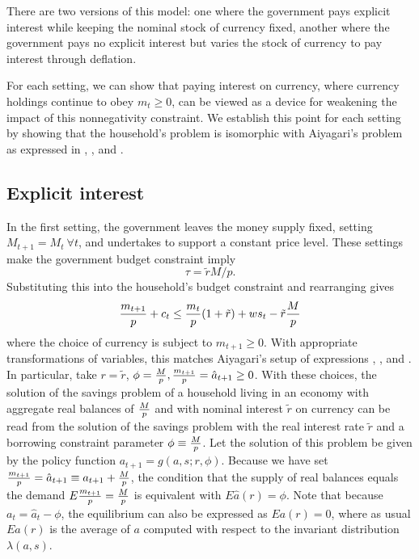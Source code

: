 There are two versions of  this model: one
where the government pays explicit interest while keeping
the nominal stock of currency fixed, another where the
government pays no explicit interest but varies the stock of
currency to pay interest through deflation.

For each setting, we can  show that
paying interest on currency, where currency holdings
continue to obey $m_t \geq 0$, can be viewed
as a device for weakening the impact of this
nonnegativity constraint.  We establish this point for each
setting
by showing that the household's problem is isomorphic
with Aiyagari's problem as expressed in  , ,
and .

\subsection{Explicit interest}
In the first setting,
the government leaves the money supply fixed, setting $M_{t+1} = M_t
\ \forall t$,
 and undertakes to support a constant price
level.
These settings make the government budget constraint imply
$$ \tau = \tilde r M / p.$$
Substituting this  into the household's budget constraint and
rearranging
gives
$$ {m_{t+1} \over p} + c_t  \leq {m_t  \over p} (1+ \tilde r)
  + w s_t  -\tilde r {M \over p}$$
where the choice of currency is subject to $m_{t+1} \geq 0$.
With appropriate transformations of variables,
this matches Aiyagari's setup of expressions , ,
and .  In particular,  take
 $r = \tilde r$, $\phi ={M \over p}, {m_{t+1} \over p} =
 \hat a_{t+1}  \geq 0$.
With these choices, the solution of the savings problem  of a household
living in an economy with aggregate real balances of ${M \over p}$ and
with nominal interest $\tilde r$ on  currency can be read from the
solution  of the savings problem with the real interest rate $\tilde r$
and a borrowing constraint parameter  $\phi \equiv {M  \over p}$.
Let the solution of this problem be given by the
policy function $a_{t+1} = g(a,s;r, \phi)$.  Because we have set
${m_{t+1}\over p} = \hat a_{t+1} \equiv a_{t+1} + {M \over p}$,
the condition that the supply of real balances equals the demand
    $ E {m_{t+1}\over p}  = {M \over p}$ is equivalent with
$E \hat a(r) = \phi$.  Note that because $a_t = \hat a_t - \phi$, the
equilibrium can also be expressed as $E a(r) = 0$, where as usual
$E a(r)$ is the  average of $a$ computed with respect to the
invariant distribution $\lambda(a,s)$.


